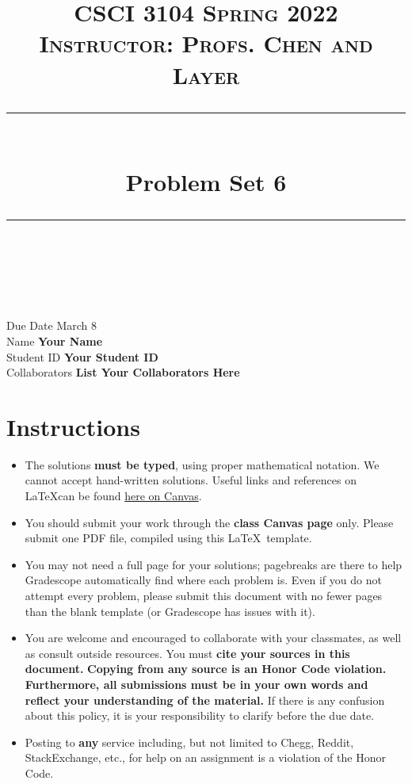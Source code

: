 \documentclass[11pt]{article}
\title{
\normalfont \normalsize 
\textsc{CSCI 3104 Spring 2022 \\ 
Instructor: Profs. Chen and Layer} \\
[10pt] 
\rule{\linewidth}{0.5pt} \\[6pt] 
\huge Problem Set 6 \\
\rule{\linewidth}{2pt}  \\[10pt]
}
\date{}
\theoremstyle{definition}
\theoremstyle{definition}
\theoremstyle{definition}
\begin{document}
\maketitle


\noindent
Due Date \dotfill March 8 \\
Name \dotfill \textbf{Your Name} \\
Student ID \dotfill \textbf{Your Student ID} \\
Collaborators \dotfill \textbf{List Your Collaborators Here}

\tableofcontents

\section*{Instructions}
 \begin{itemize}
	\item The solutions \textbf{must be typed}, using proper mathematical notation. We cannot accept hand-written solutions. Useful links and references on \LaTeX can be found \href{https://canvas.colorado.edu/courses/75824/pages/latex}{here on Canvas}.
	\item You should submit your work through the \textbf{class Canvas page} only. Please submit one PDF file, compiled using this \LaTeX \ template.
	\item You may not need a full page for your solutions; pagebreaks are there to help Gradescope automatically find where each problem is. Even if you do not attempt every problem, please submit this document with no fewer pages than the blank template (or Gradescope has issues with it).

	\item You are welcome and encouraged to collaborate with your classmates, as well as consult outside resources. You must \textbf{cite your sources in this document.} \textbf{Copying from any source is an Honor Code violation. Furthermore, all submissions must be in your own words and reflect your understanding of the material.} If there is any confusion about this policy, it is your responsibility to clarify before the due date. 

	\item Posting to \textbf{any} service including, but not limited to Chegg, Reddit, StackExchange, etc., for help on an assignment is a violation of the Honor Code.
\end{itemize}
\end{document}
